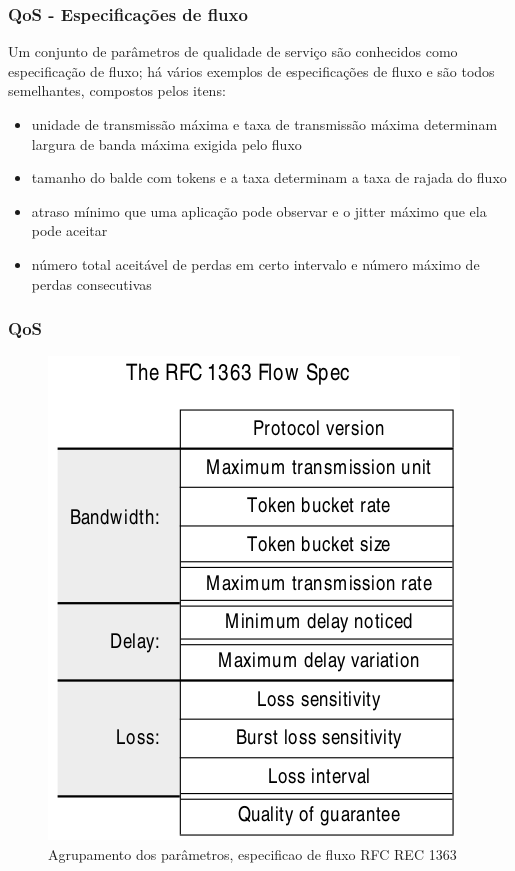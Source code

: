 \documentclass[]{beamer}
\begin{document}
\begin{frame}
  \frametitle{QoS - Especificações de fluxo}
 Um conjunto de parâmetros de qualidade de serviço são conhecidos 
como especificação de fluxo; há vários exemplos de especificações de fluxo
e são todos semelhantes, compostos pelos itens:
  \begin{itemize}
   \item unidade de transmissão máxima e taxa de transmissão máxima determinam largura de 
banda máxima exigida pelo fluxo
   \item tamanho do balde com tokens e a taxa determinam a taxa de rajada do fluxo
   \item atraso mínimo que uma aplicação pode observar e o jitter máximo que ela
pode aceitar
   \item número total aceitável de perdas em certo intervalo e número máximo de perdas
consecutivas
  \end{itemize}
\end{frame}

\begin{frame}
  \frametitle{QoS}
  \begin{figure}[hbtp]
   \caption{Agrupamento dos parâmetros, especificao de 
fluxo RFC REC 1363}
   \begin{center}
    \includegraphics[scale=0.24]{rfc1363.png}
   \end{center}
  \end{figure}

\end{frame}
\end{document}
